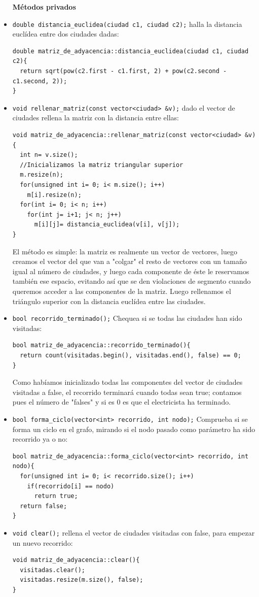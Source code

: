 \documentclass[12pt]{article}
\begin{document}
\begin{itemize}[wide, nosep, labelindent = 0pt, topsep = 1ex]
\item[\textbf{Métodos privados}] 
\item \verb|double distancia_euclidea(ciudad c1, ciudad c2);| halla la distancia euclídea entre dos ciudades dadas:
\begin{lstlisting}
double matriz_de_adyacencia::distancia_euclidea(ciudad c1, ciudad c2){
  return sqrt(pow(c2.first - c1.first, 2) + pow(c2.second - c1.second, 2));
}
\end{lstlisting} 
\item \verb|void rellenar_matriz(const vector<ciudad> &v);| dado el vector de ciudades rellena la matriz con la distancia entre ellas: 
\begin{lstlisting}
void matriz_de_adyacencia::rellenar_matriz(const vector<ciudad> &v){
  int n= v.size();
  //Inicializamos la matriz triangular superior
  m.resize(n);
  for(unsigned int i= 0; i< m.size(); i++)
    m[i].resize(n);
  for(int i= 0; i< n; i++)
    for(int j= i+1; j< n; j++)
      m[i][j]= distancia_euclidea(v[i], v[j]);
}
\end{lstlisting}
El método es simple: la matriz es realmente un vector de vectores, luego creamos el vector del que van a "colgar" el resto de vectores con un tamaño igual al número de ciudades, y luego cada componente de éste le reservamos también ese espacio, evitando así que se den violaciones de segmento cuando queremos acceder a las componentes de la matriz. Luego rellenamos el triángulo superior con la distancia euclídea entre las ciudades.
\item  \verb|bool recorrido_terminado();| Chequea si se todas las ciudades han sido visitadas: 
\begin{lstlisting}
bool matriz_de_adyacencia::recorrido_terminado(){
  return count(visitadas.begin(), visitadas.end(), false) == 0;
}
\end{lstlisting}
Como habíamos inicializado todas las componentes del vector de ciudades visitadas a false, el recorrido terminará cuando todas sean true; contamos pues el número de "falses" y si es 0 es que el electricista ha terminado. 
\item \verb|bool forma_ciclo(vector<int> recorrido, int nodo);| Comprueba si se forma un ciclo en el grafo, mirando si el nodo pasado como parámetro ha sido recorrido ya o no: 
\begin{lstlisting}
bool matriz_de_adyacencia::forma_ciclo(vector<int> recorrido, int nodo){
  for(unsigned int i= 0; i< recorrido.size(); i++)
    if(recorrido[i] == nodo)
      return true;
  return false;
}
\end{lstlisting}
\item \verb|void clear();| rellena el vector de ciudades visitadas con false, para empezar un nuevo recorrido:
\begin{lstlisting}
void matriz_de_adyacencia::clear(){
  visitadas.clear();
  visitadas.resize(m.size(), false);
}
\end{lstlisting}
\end{itemize}
\end{document}
